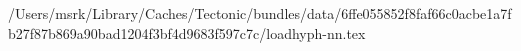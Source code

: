 /Users/msrk/Library/Caches/Tectonic/bundles/data/6ffe055852f8faf66c0acbe1a7fb27f87b869a90bad1204f3bf4d9683f597c7c/loadhyph-nn.tex